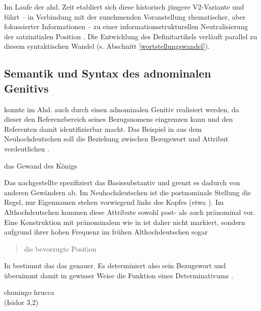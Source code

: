 Im Laufe der ahd. Zeit etabliert sich diese historisch jüngere V2-Variante und führt -- in Verbindung mit der zunehmenden Voranstellung  rhematischer, aber fokussierter Informationen -- zu einer informationsstrukturellen  Neutralisierung der satzinitialen Position \parencite[s.][323]{Hinterholzl2010}. Die Entwicklung des Definitartikels  verläuft parallel zu diesem syntaktischen Wandel (s. Abschnitt \ref{wortstellungswandel}). 

\subsection{Semantik und Syntax des adnominalen Genitivs} \label{sec:genitiv}

 konnte im Ahd. auch durch einen adnominalen Genitiv  realisiert werden, da dieser den Referenzbereich  seines Bezugsnomens eingrenzen kann und den Referenten damit identifizierbar macht. Das Beispiel in  aus dem Neuhochdeutschen soll die Beziehung zwischen Bezugswort und Attribut verdeutlichen \parencite[s.][67--68]{Szczepaniak2011a}. 
  
\begin{exe}
	\ex \label{ex:genitiv}   
	das Gewand des Königs
\end{exe}

\noindent
Das nachgestellte    spezifiziert das Basissubstantiv   und grenzt es dadurch von anderen Gewändern ab. Im Neuhochdeutschen ist die postnominale Stellung die Regel, nur Eigennamen  stehen vorwiegend links des Kopfes (etwa ). Im Althochdeutschen kommen diese Attribute sowohl post- als auch pränominal vor. Eine Konstruktion mit pränominalem  wie in  ist daher nicht markiert, sondern aufgrund ihrer hohen Frequenz im frühen Althochdeutschen sogar  \blockcquote[231]{Oubouzar1997}{die bevorzugte Position}. In  bestimmt das   das   genauer. Es determiniert also sein Bezugswort und übernimmt damit in gewisser Weise die Funktion eines Determinativums \parencite[236]{Oubouzar1997}.

\begin{exe}
	\ex \label{ex:genitiv-ahd}   
	 chuningo hrucca  \\
	 (Isidor 3,2)
\end{exe}
	
